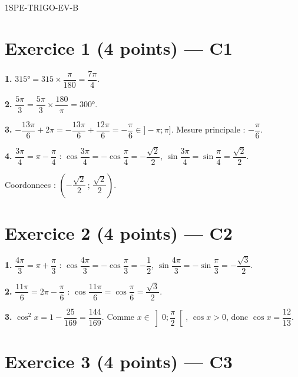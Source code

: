 \begin{corrige}{1SPE-TRIGO-EV-B}

\section*{Exercice 1 \hfill (4 points) — C1}


\textbf{1.} $315° = 315 \times \dfrac{\pi}{180} = \dfrac{7\pi}{4}$.

\textbf{2.} $\dfrac{5\pi}{3} = \dfrac{5\pi}{3} \times \dfrac{180}{\pi} = 300°$.

\textbf{3.} $-\dfrac{13\pi}{6} + 2\pi = -\dfrac{13\pi}{6} + \dfrac{12\pi}{6} = -\dfrac{\pi}{6} \in {]-\pi;\pi]}$. Mesure principale : $-\dfrac{\pi}{6}$.

\textbf{4.} $\dfrac{3\pi}{4} = \pi - \dfrac{\pi}{4}$ : $\cos\dfrac{3\pi}{4} = -\cos\dfrac{\pi}{4} = -\dfrac{\sqrt{2}}{2}$, $\sin\dfrac{3\pi}{4} = \sin\dfrac{\pi}{4} = \dfrac{\sqrt{2}}{2}$.

Coordonnees : $\left(-\dfrac{\sqrt{2}}{2}\,;\,\dfrac{\sqrt{2}}{2}\right)$.

\section*{Exercice 2 \hfill (4 points) — C2}


\textbf{1.} $\dfrac{4\pi}{3} = \pi + \dfrac{\pi}{3}$ :
$\cos\dfrac{4\pi}{3} = -\cos\dfrac{\pi}{3} = -\dfrac{1}{2}$, \quad $\sin\dfrac{4\pi}{3} = -\sin\dfrac{\pi}{3} = -\dfrac{\sqrt{3}}{2}$.

\textbf{2.} $\dfrac{11\pi}{6} = 2\pi - \dfrac{\pi}{6}$ :
$\cos\dfrac{11\pi}{6} = \cos\dfrac{\pi}{6} = \dfrac{\sqrt{3}}{2}$.

\textbf{3.} $\cos^2 x = 1 - \dfrac{25}{169} = \dfrac{144}{169}$. Comme $x \in \left]0;\dfrac{\pi}{2}\right[$, $\cos x > 0$, donc $\cos x = \dfrac{12}{13}$.

\section*{Exercice 3 \hfill (4 points) — C3}


\end{corrige}
